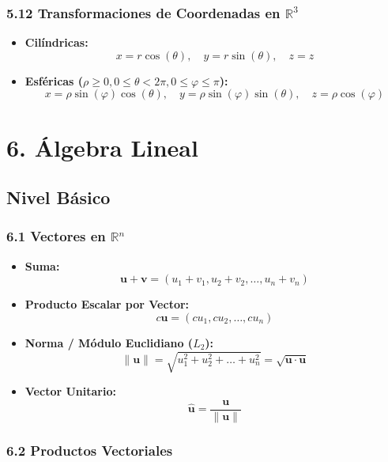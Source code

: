\documentclass[11pt,a4paper]{article}
\begin{document}
\subsubsection*{5.12 Transformaciones de Coordenadas en $\mathbb{R}^3$}

\begin{itemize}
  \item \textbf{Cilíndricas:}
  \[
    x = r\cos(\theta), \quad y = r\sin(\theta), \quad z = z
  \]
  \item \textbf{Esféricas ($\rho \ge 0, 0 \le \theta < 2\pi, 0 \le \varphi \le \pi$):}
  \[
    x = \rho\sin(\varphi)\cos(\theta), \quad y = \rho\sin(\varphi)\sin(\theta), \quad z = \rho\cos(\varphi)
  \]
\end{itemize}

\section*{6. Álgebra Lineal}

\subsection*{Nivel Básico}

\subsubsection*{6.1 Vectores en $\mathbb{R}^n$}

\begin{itemize}
  \item \textbf{Suma:}
  \[
    \mathbf{u} + \mathbf{v} = (u_1 + v_1, u_2 + v_2, \dots, u_n + v_n)
  \]
  \item \textbf{Producto Escalar por Vector:}
  \[
    c\mathbf{u} = (cu_1, cu_2, \dots, cu_n)
  \]
  \item \textbf{Norma / Módulo Euclidiano ($L_2$):}
  \[
    \|\mathbf{u}\| = \sqrt{u_1^2 + u_2^2 + \dots + u_n^2} = \sqrt{\mathbf{u} \cdot \mathbf{u}}
  \]
  \item \textbf{Vector Unitario:}
  \[
    \hat{\mathbf{u}} = \frac{\mathbf{u}}{\|\mathbf{u}\|}
  \]
\end{itemize}

\subsubsection*{6.2 Productos Vectoriales}
\end{document}
